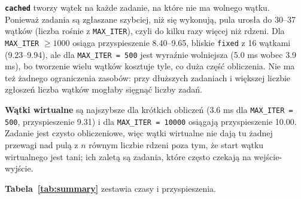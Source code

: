 \documentclass[11pt,a4paper]{article}
\begin{document}
\textbf{\texttt{cached}} tworzy wątek na każde zadanie, na które nie ma wolnego wątku. Ponieważ
zadania są zgłaszane szybciej, niż się wykonują, pula urosła do \num{30}--\num{37} wątków
(liczba rośnie z \texttt{MAX\_ITER}), czyli do kilku razy więcej niż rdzeni. Dla \texttt{MAX\_ITER} $\ge 1000$ osiąga
przyspieszenie \num{8.40}--\num{9.65}, bliskie \texttt{fixed} z 16 wątkami (\num{9.23}--\num{9.94}), ale dla
\texttt{MAX\_ITER = 500} jest wyraźnie wolniejsza (\num{5.0} ms wobec \num{3.9} ms), bo
tworzenie wielu wątków kosztuje tyle, co duża część obliczenia. Nie ma też żadnego ograniczenia
zasobów: przy dłuższych zadaniach i większej liczbie zgłoszeń liczba wątków mogłaby sięgnąć liczby zadań.

\textbf{Wątki wirtualne} są najszybsze dla krótkich obliczeń (\num{3.6} ms dla \texttt{MAX\_ITER = 500}, przyspieszenie
\num{9.31}) i dla \texttt{MAX\_ITER = 10000} osiągają przyspieszenie \num{10.00}. Zadanie jest czysto
obliczeniowe, więc wątki wirtualne nie dają tu żadnej przewagi nad pulą z $n$ równym liczbie rdzeni
poza tym, że start wątku wirtualnego jest tani; ich zaletą są zadania, które często czekają na wejście-wyjście.

\textbf{Tabela~\ref{tab:summary}} zestawia czasy i przyspieszenia.
\end{document}
